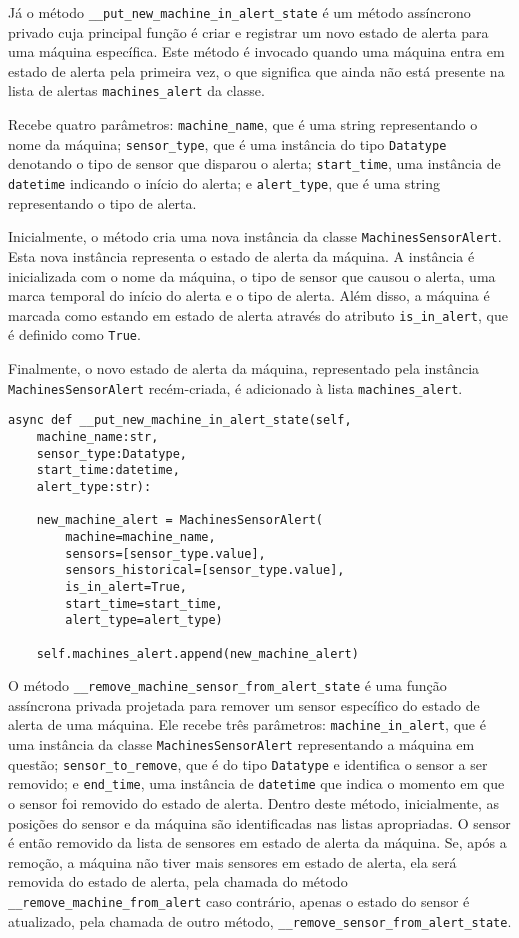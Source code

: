 Já o método \texttt{\_\_put\_new\_machine\_in\_alert\_state} é um método assíncrono privado cuja principal função é criar e registrar um novo estado de alerta para uma máquina específica. Este método é invocado quando uma máquina entra em estado de alerta pela primeira vez, o que significa que ainda não está presente na lista de alertas \texttt{machines\_alert} da classe.

Recebe quatro parâmetros: \texttt{machine\_name}, que é uma string representando o nome da máquina; \texttt{sensor\_type}, que é uma instância do tipo \texttt{Datatype} denotando o tipo de sensor que disparou o alerta; \texttt{start\_time}, uma instância de \texttt{datetime} indicando o início do alerta; e \texttt{alert\_type}, que é uma string representando o tipo de alerta.

Inicialmente, o método cria uma nova instância da classe \texttt{MachinesSensorAlert}. Esta nova instância representa o estado de alerta da máquina. A instância é inicializada com o nome da máquina, o tipo de sensor que causou o alerta, uma marca temporal do início do alerta e o tipo de alerta. Além disso, a máquina é marcada como estando em estado de alerta através do atributo \texttt{is\_in\_alert}, que é definido como \texttt{True}.

Finalmente, o novo estado de alerta da máquina, representado pela instância \texttt{MachinesSensorAlert} recém-criada, é adicionado à lista \texttt{machines\_alert}.

\begin{verbatim}
async def __put_new_machine_in_alert_state(self,
    machine_name:str,
    sensor_type:Datatype,
    start_time:datetime,
    alert_type:str):

    new_machine_alert = MachinesSensorAlert(
        machine=machine_name,
        sensors=[sensor_type.value],
        sensors_historical=[sensor_type.value],
        is_in_alert=True,
        start_time=start_time,
        alert_type=alert_type)

    self.machines_alert.append(new_machine_alert)
\end{verbatim}


O método \texttt{\_\_remove\_machine\_sensor\_from\_alert\_state} é uma função assíncrona privada projetada para remover um sensor específico do estado de alerta de uma máquina. Ele recebe três parâmetros: \texttt{machine\_in\_alert}, que é uma instância da classe \texttt{MachinesSensorAlert} representando a máquina em questão; \texttt{sensor\_to\_remove}, que é do tipo \texttt{Datatype} e identifica o sensor a ser removido; e \texttt{end\_time}, uma instância de \texttt{datetime} que indica o momento em que o sensor foi removido do estado de alerta. Dentro deste método, inicialmente, as posições do sensor e da máquina são identificadas nas listas apropriadas. O sensor é então removido da lista de sensores em estado de alerta da máquina. Se, após a remoção, a máquina não tiver mais sensores em estado de alerta, ela será removida do estado de alerta, pela chamada do método \texttt{\_\_remove\_machine\_from\_alert} caso contrário, apenas o estado do sensor é atualizado, pela chamada de outro método, \texttt{\_\_remove\_sensor\_from\_alert\_state}.

